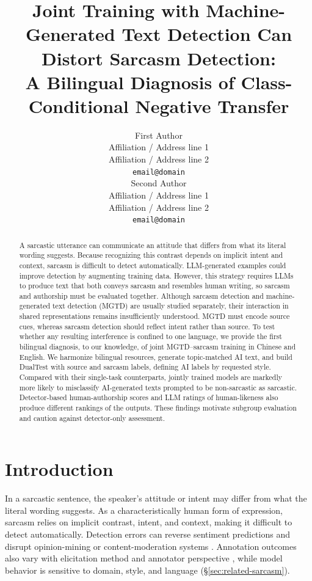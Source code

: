 \documentclass[11pt]{article}
\title{Joint Training with Machine-Generated Text Detection Can Distort Sarcasm Detection:\\A Bilingual Diagnosis of Class-Conditional Negative Transfer}
\author{First Author \\
  Affiliation / Address line 1 \\
  Affiliation / Address line 2 \\
  \texttt{email@domain} \\\And
  Second Author \\
  Affiliation / Address line 1 \\
  Affiliation / Address line 2 \\
  \texttt{email@domain} \\}
\newcommand{\Sref}[1]{\hyperref[#1]{\S\ref*{#1}}}
\begin{document}
\maketitle

\begin{abstract}
A sarcastic utterance can communicate an attitude that differs from what its literal wording suggests. Because recognizing this contrast depends on implicit intent and context, sarcasm is difficult to detect automatically. LLM-generated examples could improve detection by augmenting training data. However, this strategy requires LLMs to produce text that both conveys sarcasm and resembles human writing, so sarcasm and authorship must be evaluated together. Although sarcasm detection and machine-generated text detection (MGTD) are usually studied separately, their interaction in shared representations remains insufficiently understood. MGTD must encode source cues, whereas sarcasm detection should reflect intent rather than source. To test whether any resulting interference is confined to one language, we provide the first bilingual diagnosis, to our knowledge, of joint MGTD--sarcasm training in Chinese and English. We harmonize bilingual resources, generate topic-matched AI text, and build DualTest with source and sarcasm labels, defining AI labels by requested style. Compared with their single-task counterparts, jointly trained models are markedly more likely to misclassify AI-generated texts prompted to be non-sarcastic as sarcastic. Detector-based human-authorship scores and LLM ratings of human-likeness also produce different rankings of the outputs. These findings motivate subgroup evaluation and caution against detector-only assessment.
\end{abstract}

\section{Introduction}
\label{sec:intro}

In a sarcastic sentence, the speaker's attitude or intent may differ from what the literal wording suggests. As a characteristically human form of expression, sarcasm relies on implicit contrast, intent, and context, making it difficult to detect automatically. Detection errors can reverse sentiment predictions and disrupt opinion-mining or content-moderation systems \citep{tay2018reasoning,vidgen2019challenges}. Annotation outcomes also vary with elicitation method and annotator perspective \citep{oprea2020isarcasm,casola2024multipico}, while model behavior is sensitive to domain, style, and language \citep{jang2024csc,casola2024multipico} (\Sref{sec:related-sarcasm}).
\end{document}
